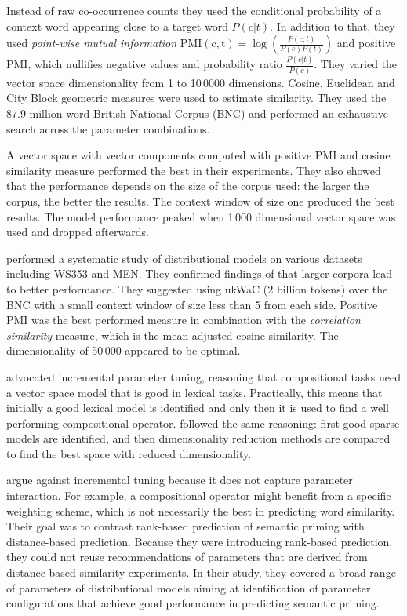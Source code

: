 Instead of raw co-occurrence counts they used the conditional probability of a context word appearing close to a target word $P(c|t)$. In addition to that, they used \emph{point-wise mutual information} $\operatorname{PMI(c,t)} = \log\left(\frac{P(c,t)}{P(c)P(t)}\right)$ and positive PMI, which nullifies negative values and probability ratio $\frac{P(c|t)}{P(c)}$. They varied the vector space dimensionality from 1 to 10\,0000 dimensions.  Cosine, Euclidean and City Block geometric measures were used to estimate similarity. They used the 87.9 million word British National Corpus (BNC) and performed an exhaustive search across the parameter combinations.

A vector space with vector components computed with positive PMI and cosine similarity measure performed the best in their experiments. They also showed that the performance depends on the size of the corpus used: the larger the corpus, the better the results. The context window of size one produced the best results. The model performance peaked when 1\,000 dimensional vector space was used and dropped afterwards.

 performed a systematic study of distributional models on various datasets including WS353 and MEN. They confirmed findings of  that larger corpora lead to better performance. They suggested using ukWaC (2 billion tokens) over the BNC with a small context window of size less than 5 from each side. Positive PMI was the best performed measure in combination with the \emph{correlation similarity} measure, which is the mean-adjusted cosine similarity. The dimensionality of 50\,000 appeared to be optimal.

\citet{kiela-clark:2014:CVSC} advocated incremental parameter tuning, reasoning that compositional tasks need a vector space model that is good in lexical tasks. Practically, this means that initially a good lexical model is identified and only then it is used to find a well performing compositional operator. \citet{BullinariaLevy2012} followed the same reasoning: first good sparse models are identified, and then dimensionality reduction methods are compared to find the best space with reduced dimensionality.

\citet{lapesa-evert:2013:CMCL} argue against incremental tuning because it does not capture parameter interaction. For example, a compositional operator might benefit from a specific weighting scheme, which is not necessarily the best in predicting word similarity. Their goal was to contrast rank-based prediction of semantic priming with distance-based prediction. Because they were introducing rank-based prediction, they could not reuse recommendations of parameters that are derived from distance-based similarity experiments. In their study, they covered a broad range of parameters of distributional models aiming at identification of parameter configurations that achieve good performance in predicting semantic priming.


